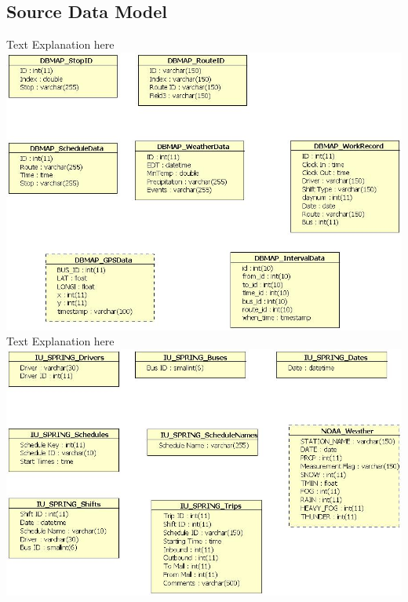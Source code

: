\documentclass[12pt]{article}
\begin{document}
\subsection{Source Data Model}
Text Explanation here\\
\includegraphics[scale=0.5]{resources/dbmap_access}\\[1cm] 
Text Explanation here\\
\includegraphics[scale=0.5]{resources/IU_access}\\[1cm] 
\end{document}
